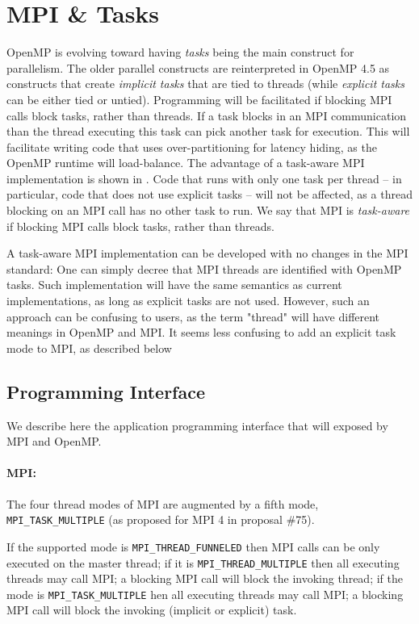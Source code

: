 \section{MPI \& Tasks}
		OpenMP is evolving toward having \emph{tasks} being the main construct 
		for parallelism. The older parallel constructs are reinterpreted in 
		OpenMP 4.5 as constructs that create \emph{implicit tasks} that are 
		tied to threads (while \emph{explicit tasks} can be either tied or 
		untied). Programming will be facilitated if blocking MPI calls block 
		tasks, rather than threads. If a task blocks in an MPI communication 
		than the thread executing this task can pick another task for 
		execution. This will facilitate writing code that uses 
		over-partitioning for latency hiding, as the OpenMP runtime will 
		load-balance. The advantage of a task-aware MPI implementation is shown 
		in \cite{mpiult}. Code that runs with only one task per thread -- in 
		particular, code that does not use explicit tasks -- will not be 
		affected, as a thread blocking on an MPI call has no other task to 
		run.  We say that MPI is \emph{task-aware} if blocking MPI calls block 
		tasks, rather than threads.
		
		A task-aware MPI implementation can be developed with no changes in the 
		MPI standard: One can simply decree that MPI threads are identified 
		with OpenMP tasks. Such implementation will have the same semantics as 
		current implementations, as long as explicit tasks are not used. 
		However, such an approach can be confusing to users, as the term 
		"thread"
		will have different meanings in OpenMP and MPI. It seems less confusing 
		to add an 
		explicit  task mode to MPI, as described below
		
			
\subsection{Programming Interface}
We describe here the application programming interface that will exposed by MPI 
and OpenMP.

\paragraph{MPI:}
The four thread modes of MPI are augmented by a fifth mode, 
\texttt{MPI\_TASK\_MULTIPLE} (as proposed for MPI 4 in proposal \#75). 

If the supported mode is \texttt{MPI\_THREAD\_FUNNELED} then MPI calls can be 
only executed on the master thread;
if it is  \texttt{MPI\_THREAD\_MULTIPLE} then all executing threads may call 
MPI; a blocking MPI call will block the invoking thread; if the mode is 
\texttt{MPI\_TASK\_MULTIPLE} hen all executing threads may call MPI; a blocking 
MPI call will block the invoking (implicit or explicit) task.

